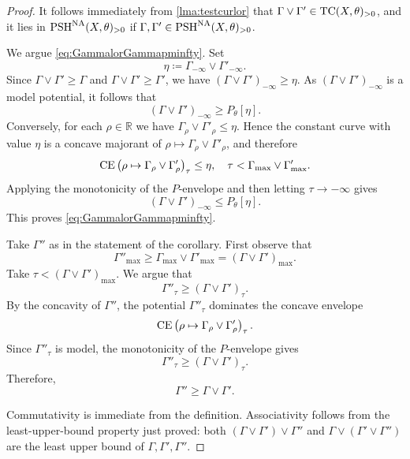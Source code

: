 \begin{proof}
    It follows immediately from \cref{lma:testcurlor} that $\Gamma\lor \Gamma'\in \mathrm{TC}(X,\theta)_{>0}$, and it lies in $\mathrm{PSH}^{\mathrm{NA}}(X,\theta)_{>0}$ if $\Gamma,\Gamma'\in \mathrm{PSH}^{\mathrm{NA}}(X,\theta)_{>0}$.

    We argue \eqref{eq:GammalorGammapminfty}. Set
    \[
        \eta\coloneqq \Gamma_{-\infty}\lor \Gamma'_{-\infty}.
    \]
    Since $\Gamma\lor\Gamma'\geq \Gamma$ and $\Gamma\lor\Gamma'\geq \Gamma'$, we have $(\Gamma\lor\Gamma')_{-\infty}\geq \eta$. As $(\Gamma\lor\Gamma')_{-\infty}$ is a model potential, it follows that
    \[
        (\Gamma\lor\Gamma')_{-\infty}\geq P_\theta[\eta].
    \]
    Conversely, for each $\rho\in \mathbb{R}$ we have $\Gamma_\rho\lor\Gamma'_\rho\leq \eta$. Hence the constant curve with value $\eta$ is a concave majorant of $\rho\mapsto \Gamma_\rho\lor\Gamma'_\rho$, and therefore
    \[
        \operatorname{CE}\left(\rho\mapsto\Gamma_\rho\lor\Gamma'_\rho\right)_\tau\leq \eta,\quad \tau<\Gamma_{\max}\lor\Gamma'_{\max}.
    \]
    Applying the monotonicity of the $P$-envelope and then letting $\tau\to -\infty$ gives
    \[
        (\Gamma\lor\Gamma')_{-\infty}\leq P_\theta[\eta].
    \]
    This proves \eqref{eq:GammalorGammapminfty}.



    Take $\Gamma''$ as in the statement of the corollary.
    First observe that
    \[
        \Gamma''_{\max}\geq \Gamma_{\max} \lor \Gamma'_{\max}=(\Gamma\lor \Gamma')_{\max}.
    \]
    Take $\tau<(\Gamma\lor \Gamma')_{\max}$. We argue that
    \[
    \Gamma''_{\tau}\geq (\Gamma\lor \Gamma')_{\tau}.
    \]
    By the concavity of $\Gamma''$, the potential $\Gamma''_\tau$ dominates the concave envelope
    \[
    \operatorname{CE}\left(\rho\mapsto \Gamma_{\rho}\lor \Gamma'_{\rho}\right)_\tau.
    \]
    Since $\Gamma''_\tau$ is model, the monotonicity of the $P$-envelope gives
    \[
    \Gamma''_{\tau}\geq (\Gamma\lor \Gamma')_{\tau}.
    \]
    Therefore,
    \[
    \Gamma''\geq \Gamma\lor \Gamma'.
    \]

    Commutativity is immediate from the definition. Associativity follows from the least-upper-bound property just proved: both $(\Gamma\lor\Gamma')\lor\Gamma''$ and $\Gamma\lor(\Gamma'\lor\Gamma'')$ are the least upper bound of $\Gamma,\Gamma',\Gamma''$.
\end{proof}


